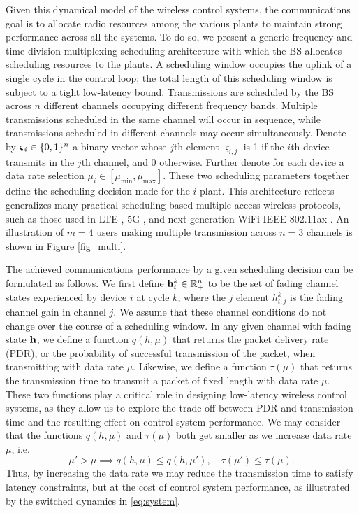 Given this dynamical model of the wireless control systems, the communications goal is to allocate radio resources among the various plants to maintain strong performance across all the systems. To do so, we present a generic frequency and time division multiplexing scheduling architecture with which the BS allocates scheduling resources to the plants. A scheduling window occupies the uplink of a single cycle in the control loop; the total length of this scheduling window is subject to a tight low-latency bound. Transmissions are scheduled by the BS across $n$ different channels occupying different frequency bands. Multiple transmissions scheduled in the same channel will occur in sequence, while transmissions scheduled in different channels may occur simultaneously. Denote by $\boldsymbol{\varsigma}_i \in \{0,1\}^n$ a binary vector whose $j$th element $\varsigma_{i,j}$ is 1 if the $i$th device transmits in the $j$th channel, and 0 otherwise. Further denote for each device a data rate selection $\mu_i \in [\mu_{\min}, \mu_{\max}]$. These two scheduling parameters together define the scheduling decision made for the $i$ plant. This architecture reflects generalizes many practical scheduling-based multiple access wireless protocols, such as those used in LTE \cite{sesia2011lte} , 5G \cite{agiwal2016next}, and next-generation WiFi IEEE 802.11ax \cite{liu2014ieee}. An illustration of $m=4$ users making multiple transmission across $n=3$ channels is shown in Figure \ref{fig_multi}.

The achieved communications performance by a given scheduling decision can be formulated as follows. We first define ${\mathbf h}^k_{i} \in {\mathbb R}^n_+$ to be the set of fading channel states experienced by device $i$ at cycle $k$, where the $j$ element $h^k_{i,j}$ is the fading channel gain in channel $j$. We assume that these channel conditions do not change over the course of a scheduling window. In any given channel with fading state ${\mathbf h}$, we define a function $q(h,\mu)$ that returns the packet delivery rate (PDR), or the probability of successful transmission of the packet, when transmitting with data rate $\mu$. Likewise, we define a function $\tau(\mu)$ that returns the transmission time to transmit a packet of fixed length with data rate $\mu$. These two functions play a critical role in designing low-latency wireless control systems, as they allow us to explore the trade-off between PDR and transmission time and the resulting effect on control system performance. We may consider that the functions $q(h, \mu)$ and $\tau(\mu)$ both get smaller as we increase data rate $\mu$, i.e.
%
\begin{equation}
\mu' > \mu \implies q(h, \mu) \leq q(h, \mu'), \quad \tau(\mu') \leq \tau(\mu).
\end{equation}
%
Thus, by increasing the data rate we may reduce the transmission time to satisfy latency constraints, but at the cost of control system performance, as illustrated by the switched dynamics in \eqref{eq:system}.

